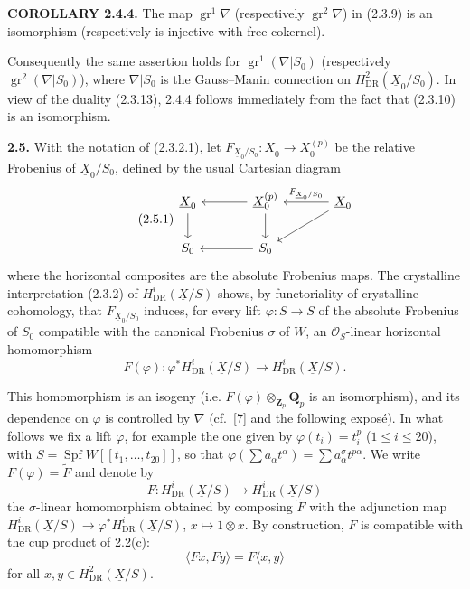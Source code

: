 \documentclass[10pt]{article}
\newcommand{\UX}{\underline{X}}
\begin{document}
\noindent\textbf{COROLLARY 2.4.4.} The map $\operatorname{gr}^1\nabla$ (respectively $\operatorname{gr}^2\nabla$) in (2.3.9) is an isomorphism (respectively is injective with free cokernel).

Consequently the same assertion holds for $\operatorname{gr}^1(\nabla|S_0)$ (respectively $\operatorname{gr}^2(\nabla|S_0)$), where $\nabla|S_0$ is the Gauss--Manin connection on $H^2_{\mathrm{DR}}(\UX_0/S_0)$. In view of the duality (2.3.13), 2.4.4 follows immediately from the fact that (2.3.10) is an isomorphism.

\noindent\textbf{2.5.} With the notation of (2.3.2.1), let $F_{\UX_0/S_0}:\UX_0\to \UX_0^{(p)}$ be the relative Frobenius of $\UX_0/S_0$, defined by the usual Cartesian diagram
\begin{equation}\tag{2.5.1}
\begin{tikzcd}[column sep=large,row sep=2em]
\UX_0\arrow[d] & \UX_0^{(p)}\arrow[l]\arrow[d] & \UX_0\arrow[l,"F_{\UX_0/S_0}"']\arrow[dl]\\
S_0 & S_0\arrow[l] &
\end{tikzcd}
\end{equation}
where the horizontal composites are the absolute Frobenius maps. The crystalline interpretation (2.3.2) of $H^i_{\mathrm{DR}}(\UX/S)$ shows, by functoriality of crystalline cohomology, that $F_{\UX_0/S_0}$ induces, for every lift $\varphi:S\to S$ of the absolute Frobenius of $S_0$ compatible with the canonical Frobenius $\sigma$ of $W$, an $\mathcal O_S$-linear horizontal homomorphism
\begin{equation}\tag{2.5.2}
F(\varphi):\varphi^*H^i_{\mathrm{DR}}(\UX/S)\longrightarrow H^i_{\mathrm{DR}}(\UX/S).
\end{equation}
\newpage
\setcounter{footnote}{0}
\fontsize{10.2pt}{12.04pt}\selectfont

This homomorphism is an isogeny (i.e. $F(\varphi)\otimes_{\mathbf Z_p}\mathbf Q_p$ is an isomorphism), and its dependence on $\varphi$ is controlled by $\nabla$ (cf.~[7] and the following exposé). In what follows we fix a lift $\varphi$, for example the one given by $\varphi(t_i)=t_i^p$ ($1\le i\le20$), with $S=\operatorname{Spf}W[[t_1,\ldots,t_{20}]]$, so that
$\varphi(\sum a_{\alpha}t^{\alpha})=\sum a_{\alpha}^{\sigma}t^{p\alpha}$. We write $F(\varphi)=\widetilde F$ and denote by
\begin{equation}\tag{2.5.3}
F:H^i_{\mathrm{DR}}(\UX/S)\longrightarrow H^i_{\mathrm{DR}}(\UX/S)
\end{equation}
the $\sigma$-linear homomorphism obtained by composing $\widetilde F$ with the adjunction map
$H^i_{\mathrm{DR}}(\UX/S)\to\varphi^*H^i_{\mathrm{DR}}(\UX/S)$, $x\mapsto1\otimes x$. By construction, $F$ is compatible with the cup product of 2.2(c):
\begin{equation}\tag{2.5.4}
\langle Fx,Fy\rangle=F\langle x,y\rangle
\end{equation}
for all $x,y\in H^2_{\mathrm{DR}}(\UX/S)$.
\end{document}
